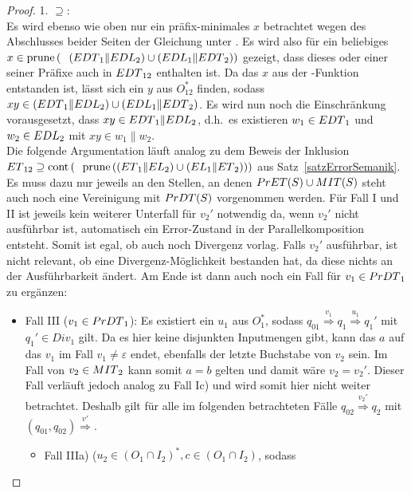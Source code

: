 \begin{proof}
  1. \glqq{}$\supseteq$\grqq{}:\\
  Es wird ebenso wie oben nur ein präfix-minimales $x$ betrachtet wegen des
  Abschlusses beider Seiten der Gleichung unter \cont{}. Es wird also für ein
  beliebiges $x\in\mathrm{prune}{}\left(\right.$ $\left.\left(EDT{}_1\|
  EDL{}_2\right)\cup \left(EDL{}_1\|EDT{}_2\right)\right)$ gezeigt, dass
  dieses oder einer seiner Präfixe auch in $EDT{}_{12}$ enthalten ist. Da das
  $x$ aus der \prune{}-Funktion entstanden ist, lässt sich ein $y$ aus
  $O_{12}^*$ finden, sodass $xy\in (EDT{}_1\|EDL{}_2)\cup
  (EDL{}_1\|EDT{}_2)$. Es wird nun noch die Einschränkung vorausgesetzt,
  dass \oBdA{} $xy\in EDT{}_1\|EDL{}_2$, d.h.\ es existieren
  $w_1\in EDT{}_1$ und $w_2\in EDL{}_2$ mit $xy\in w_1\|w_2$.\\
  Die folgende Argumentation läuft analog zu dem Beweis der Inklusion
  $ET{}_{12} \supseteq \mathrm{cont}{}\left(\right.$ $\left.\mathrm{prune}{}\left(\left(ET{}_1\|EL_2\right)\cup
  \left(EL{}_1\|ET{}_2\right)\right)\right)$ aus Satz~\ref{satzErrorSemanik}. Es muss dazu nur
  jeweils an den Stellen, an denen $PrET{}(S)\cup MIT{}(S)$ steht auch noch eine
  Vereinigung mit $PrDT{}(S)$ vorgenommen werden. Für Fall I und II ist
  jeweils kein weiterer Unterfall für $v_2'$ notwendig da, wenn $v_2'$ nicht
  ausführbar ist, automatisch ein Error-Zustand in der Parallelkomposition entsteht.
  Somit ist egal, ob auch noch Divergenz vorlag. Falls $v_2'$ ausführbar, ist
  nicht relevant, ob eine Divergenz-Möglichkeit bestanden hat, da diese
  nichts an der Ausführbarkeit ändert. Am Ende ist dann auch noch ein Fall für
  $v_1\in PrDT{}_1$ zu ergänzen:
  \begin{itemize}
    \item Fall III ($v_1\in PrDT{}_1$): Es existiert ein $u_1$ aus $O_1^*$,
      sodass $q_{01} \overset{v_1}{\Rightarrow} q_1 \overset{u_1}{\Rightarrow}
      q_1'$ mit $q_1'\in Div_1$ gilt. Da es hier keine disjunkten Inputmengen gibt, kann das
      $a$ auf das $v_1$ im Fall $v_1\neq \varepsilon$ endet, ebenfalls der
      letzte Buchstabe von $v_2$ sein. Im Fall von $v_2\in MIT{}_2$ kann somit
      $a=b$ gelten und damit wäre $v_2= v_2'$. Dieser Fall verläuft jedoch
      analog zu Fall Ic) und wird somit hier nicht weiter betrachtet. Deshalb
      gilt für alle im folgenden betrachteten Fälle $q_{02} \overset{v_2'}{\Rightarrow}
      q_2$ mit $(q_{01},q_{02}) \overset{v'}{\Rightarrow}$.
      \begin{itemize}
        \item Fall IIIa) \Big($u_2\in (O_1\cap I_2)^*, c\in (O_1\cap I_2)$, sodass

\end{itemize}
\end{itemize}
\end{proof}
